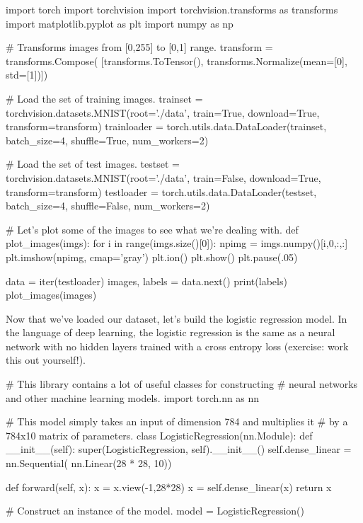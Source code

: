 \begin{python}
import torch
import torchvision
import torchvision.transforms as transforms
import matplotlib.pyplot as plt
import numpy as np

# Transforms images from [0,255] to [0,1] range.
transform = transforms.Compose(
    [transforms.ToTensor(),
     transforms.Normalize(mean=[0], std=[1])])

# Load the set of training images.
trainset = torchvision.datasets.MNIST(root='./data', train=True, download=True, transform=transform)
trainloader = torch.utils.data.DataLoader(trainset, batch_size=4, shuffle=True, num_workers=2)

# Load the set of test images.
testset = torchvision.datasets.MNIST(root='./data', train=False, download=True, transform=transform)
testloader = torch.utils.data.DataLoader(testset, batch_size=4, shuffle=False, num_workers=2)

# Let's plot some of the images to see what we're dealing with.
def plot_images(imgs):
  for i in range(imgs.size()[0]):
    npimg = imgs.numpy()[i,0,:,:]
    plt.imshow(npimg, cmap='gray')
    plt.ion()
    plt.show()
    plt.pause(.05)

data = iter(testloader)
images, labels = data.next()
print(labels)
plot_images(images)
\end{python}
Now that we've loaded our dataset, let's build the logistic regression model. In the language of deep learning, the logistic regression is the same as a neural network with no hidden layers trained with a cross entropy loss (exercise: work this out yourself!).
\begin{python}
# This library contains a lot of useful classes for constructing 
# neural networks and other machine learning models.
import torch.nn as nn

# This model simply takes an input of dimension 784 and multiplies it 
# by a 784x10 matrix of parameters.
class LogisticRegression(nn.Module):
  def __init__(self):
    super(LogisticRegression, self).__init__()
    self.dense_linear = nn.Sequential(
      nn.Linear(28 * 28, 10))

  def forward(self, x):
    x = x.view(-1,28*28)
    x = self.dense_linear(x)
    return x
  
# Construct an instance of the model.
model = LogisticRegression()
\end{python}


